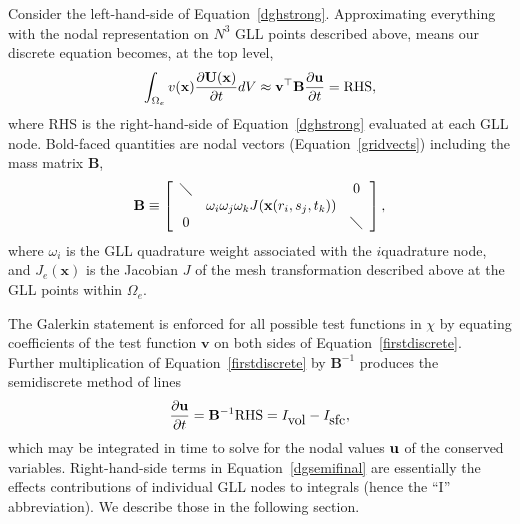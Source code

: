 Consider the left-hand-side of Equation~\ref{dghstrong}. Approximating everything with
the nodal representation on $N^3$ GLL points described above,
means our discrete equation becomes, at the top level,
\begin{equation}
\int_{\Omega_e} v({\bf x}) \frac{\partial {\bf U}({\bf x})}{\partial t}dV \approx {\bf v}^{\top}\mathbf{B}\frac{\partial {\bf u}}{\partial t} =
\mbox{RHS},
\label{firstdiscrete}
\end{equation}
where RHS is the right-hand-side of Equation~\ref{dghstrong}
evaluated at each GLL node. Bold-faced quantities are nodal vectors (Equation~\ref{gridvects}) including
the mass matrix $\mathbf{B}$,
\begin{equation}
\mathbf{B}\equiv \left[\begin{array}{ccc} \diagdown & & 0 \\ &  \omega_i\omega_j\omega_k J(\mathbf{x}(r_i,s_j,t_k)) &  \\  0 & & \diagdown \end{array}\right],
\label{masslex}
\end{equation}
where $\omega_i$ is the GLL quadrature weight associated with the $i$\nth quadrature
node,
and $J_e(\mathbf{x})$ is the Jacobian $J$ of the mesh transformation described
above at the GLL points within $\Omega_e$.

The Galerkin statement is enforced for all possible test functions in $\chi$ by
equating coefficients of the test function $\mathbf{v}$ on both sides of Equation~\ref{firstdiscrete}.
Further multiplication of Equation~\ref{firstdiscrete} by $\mathbf{B}^{-1}$ produces the semidiscrete method of lines
\begin{equation}
\frac{\partial {\bf u}}{\partial t} =\mathbf{B}^{-1}\mbox{RHS}=I_{\mbox{vol}}-I_{\mbox{sfc}},
\label{dgsemifinal}
\end{equation}
which may be integrated in time to solve for the nodal values ${\bf u}$ of the conserved variables.
Right-hand-side terms in Equation~\ref{dgsemifinal} are essentially the effects
contributions of individual GLL nodes to integrals (hence the ``I''
abbreviation). We describe those in the following section.
